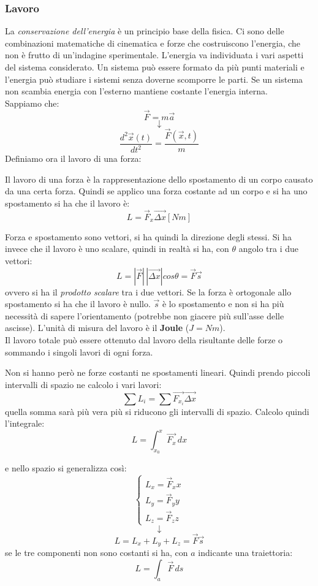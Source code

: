 \documentclass[a4paper,12pt, oneside]{book}
\begin{document}
\subsubsection{Lavoro}
La \textit{conservazione dell'energia} è un principio base della fisica. Ci sono delle combinazioni matematiche di cinematica e forze che costruiscono l'energia, che non è frutto di un'indagine sperimentale. L'energia va individuata i vari aspetti del sistema considerato. Un sistema può essere formato da più punti materiali e l'energia può studiare i sistemi senza doverne scomporre le parti. Se un sistema non scambia energia con l'esterno mantiene costante l'energia interna.\\
Sappiamo che:
$$\vec{F}=m\vec{a}$$
$$\downarrow$$
$$\frac{d^2\vec{x}(t)}{dt^2}=\frac{\vec{F}(\vec{x},t)}{m}$$
Definiamo ora il lavoro di una forza:
\begin{definizione}
Il lavoro di una forza è la rappresentazione dello spostamento di un corpo causato da una certa forza. Quindi se applico una forza costante ad un corpo e si ha uno spostamento si ha che il lavoro è:
$$L=\vec{F}_x\vec{\Delta x}[Nm]$$

Forza e spostamento sono vettori, si ha quindi la direzione degli stessi. Si ha invece che il lavoro è uno scalare, quindi in realtà si ha, con $\theta$ angolo tra i due vettori:
$$L=|\vec{F}|\,|\vec{\Delta x}|cos\theta=\vec{F}\vec{s}$$
ovvero si ha il \textit{prodotto scalare} tra i due vettori. Se la forza è ortogonale allo spostamento si ha che il lavoro è nullo. $\vec{s}$ è lo spostamento e non si ha più necessità di sapere l'orientamento (potrebbe non giacere più sull'asse  delle ascisse). L'unità di misura del lavoro è il \textbf{Joule} ($J=Nm$). \\
Il lavoro totale può essere ottenuto dal lavoro della risultante delle forze o sommando i singoli lavori di ogni forza.
\end{definizione}
Non si hanno però ne forze costanti ne spostamenti lineari. Quindi prendo piccoli intervalli di spazio ne calcolo i vari lavori:
$$\sum	L_i= \sum \vec{F_{x_i}}\vec{\Delta x}$$
quella somma sarà più vera più si riducono gli intervalli di spazio. Calcolo quindi l'integrale:
$$L=\int_{x_0}^x \vec{F_x}\,dx$$

e nello spazio si generalizza così:
$$
\begin{cases}
L_x=\vec{F}_x x\\
L_y=\vec{F}_y y\\
L_z=\vec{F}_z z
\end{cases}$$
$$\downarrow$$
$$L=L_x+L_y+L_z=\vec{F}\vec{s}$$
se le tre componenti non sono costanti si ha, con $a$ indicante una traiettoria:
$$L=\int_a \vec{F}\, ds$$
\end{document}
